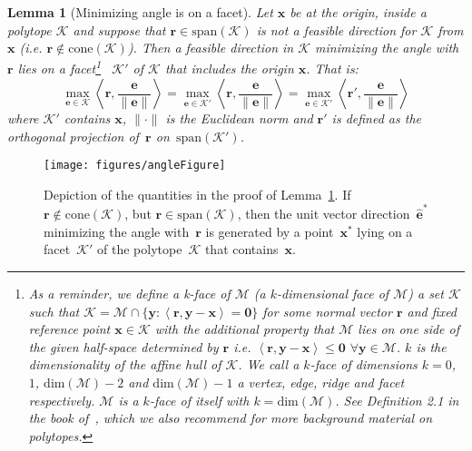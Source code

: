\documentclass{article} %
\newtheorem{lemma}[definition]{Lemma}
\newcommand{\domain}{\mathcal{M}} %
\newcommand{\x}{\bm{x}}
\newcommand{\y}{\bm{y}}
\renewcommand{\r}{\bm{r}}
\newcommand{\innerProd}[2]{\left\langle #1 , #2 \right\rangle}
\newcommand{\Kface}{\mathcal{K}}
\newcommand{\err}{\bm{e}} %
\newcommand{\0}{\mathbf{0}} %
\begin{document}
\begin{lemma}[Minimizing angle is on a facet] \label{lem:minAngle}
Let $\x$ be at the origin, inside a polytope $\Kface$ and suppose that $\r \in \text{span}(\Kface)$ is not a feasible direction for $\Kface$ from $\x$ (i.e. $\r \notin \text{cone}(\Kface)$). Then a feasible direction in $\Kface$ minimizing the angle with $\r$ lies on a facet\footnote{As a reminder, we define a \emph{k-face} of
$\domain$ (a $k$-dimensional face of $\domain$) a set $\Kface$ such that
$\Kface = \domain \cap \{ \y : \innerProd{\r}{\y - \x} = \0 \}$ for some
normal vector $\r$ and fixed reference point $\x \in \Kface$ with the
additional property that $\domain$ lies on one side of the given half-space
determined by $\r$ i.e. $ \innerProd{\r}{\y - \x} \leq \0$ $\forall \y \in
\domain$. $k$ is the dimensionality of the affine hull of $\Kface$. We call a
$k$-face of dimensions $k = 0$, $1$, $\textrm{dim}(\domain)-2$ and
$\textrm{dim}(\domain)-1$ a \emph{vertex}, \emph{edge}, \emph{ridge} and
\emph{facet} respectively. $\domain$ is a $k$-face of itself with $k =
\textrm{dim}(\domain)$. See Definition 2.1 in the book of~, which we also recommend for more background material on polytopes.}%
~$\Kface'$ of $\Kface$ that includes the origin $\x$. That is:
\begin{equation} \label{eq:angleRelation}
\max_{\err \in \Kface} \innerProd{\r}{\frac{\err}{\|\err\|}} = \max_{\err \in \Kface'} \innerProd{\r}{\frac{\err}{\|\err\|}} =  \max_{\err \in \Kface'} \innerProd{\r'}{\frac{\err}{\|\err\|}}
\end{equation}
where $\Kface'$ contains $\x$, $\|\cdot \|$ is the Euclidean norm and $\r'$ is defined
as the orthogonal projection of~$\r$ on~$\text{span}(\Kface')$.
\end{lemma}

\begin{figure}[t]
\begin{center}
\texttt{[image: figures/angleFigure]}
\end{center}
\vspace{-4mm}
\caption{Depiction of the quantities in the proof of Lemma~\ref{lem:minAngle}. 
If $\r \notin \text{cone}(\Kface)$, but $\r \in \text{span}(\Kface)$, then the unit vector
direction~$\hat{\err}^*$ minimizing the angle with~$\r$ is generated
by a point~$\x^*$ lying on a facet~$\Kface'$ of the polytope~$\Kface$
that contains~$\x$. \vspace{5mm}} \label{fig:rFig}
\end{figure}
\end{document}
